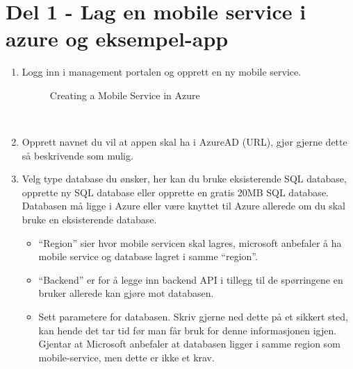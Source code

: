 \section{Del 1 - Lag en mobile service i azure og eksempel-app}
\begin{enumerate}
\item Logg inn i management portalen og opprett en ny mobile service.
\\
\begin{figure}[H]
    \centering
    \setlength{\fboxsep}{0pt}%
    \setlength{\fboxrule}{1pt}%
    \caption{Creating a Mobile Service in Azure}
\end{figure}

\\
\item Opprett navnet du vil at appen skal ha i AzureAD (URL), gjør gjerne dette så beskrivende som mulig.
\\
\item Velg type database du ønsker, her kan du bruke eksisterende SQL database, opprette ny SQL database eller opprette en gratis 20MB SQL database. Databasen må ligge i Azure eller være knyttet til Azure allerede om du skal bruke en eksisterende database.
\\
\begin{itemize}
\item “Region” sier hvor mobile servicen skal lagres, microsoft anbefaler å ha mobile service og database lagret i samme “region”.
\item “Backend” er for å legge inn backend API i tillegg til de spørringene en bruker allerede kan gjøre mot databasen.
\item Sett parametere for databasen. Skriv gjerne ned dette på et sikkert sted, kan hende det tar tid før man får bruk for denne informasjonen igjen. Gjentar at Microsoft anbefaler at databasen ligger i samme region som mobile-service, men dette er ikke et krav.
\end{itemize}
\bigskip


\end{enumerate}
